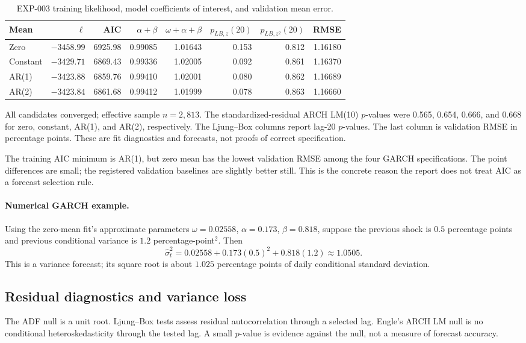 \documentclass[11pt,a4paper]{article}
\begin{document}
\begin{table}[htbp]
\centering\small
\caption{EXP-003 training likelihood, model coefficients of interest, and validation mean error.}
\label{tab:garch-specifications}
\begin{tabular}{lrrrrrrr}
\toprule
Mean & $\ell$ & AIC & $\alpha+\beta$ & $\omega+\alpha+\beta$ & $p_{LB,z}(20)$ & $p_{LB,z^2}(20)$ & RMSE\\
\midrule
Zero & $-3458.99$ & 6925.98 & 0.99085 & 1.01643 & 0.153 & 0.812 & 1.16180\\
Constant & $-3429.71$ & 6869.43 & 0.99336 & 1.02005 & 0.092 & 0.861 & 1.16370\\
AR(1) & $-3423.88$ & 6859.76 & 0.99410 & 1.02001 & 0.080 & 0.862 & 1.16689\\
AR(2) & $-3423.84$ & 6861.68 & 0.99412 & 1.01999 & 0.078 & 0.863 & 1.16660\\
\bottomrule
\end{tabular}
\begin{minipage}{0.96\linewidth}\footnotesize
All candidates converged; effective sample $n=2,813$. The standardized-residual ARCH LM(10)
$p$-values were 0.565, 0.654, 0.666, and 0.668 for zero, constant, AR(1), and AR(2), respectively.
The Ljung--Box columns report lag-20 $p$-values. The last column is validation RMSE in percentage
points. These are fit diagnostics and forecasts, not proofs of correct specification.
\end{minipage}
\end{table}
The training AIC minimum is AR(1), but zero mean has the lowest validation RMSE among the four
GARCH specifications. The point differences are small; the registered validation baselines are
slightly better still. This is the concrete reason the report does not treat AIC as a forecast
selection rule.

\paragraph{Numerical GARCH example.} Using the zero-mean fit's approximate parameters
$\omega=0.02558$, $\alpha=0.173$, $\beta=0.818$, suppose the previous shock is $0.5$ percentage
points and previous conditional variance is $1.2$ percentage-point$^2$. Then
\[
 \widehat\sigma_t^2=0.02558+0.173(0.5)^2+0.818(1.2)\approx1.0505.
\]
This is a variance forecast; its square root is about $1.025$ percentage points of daily
conditional standard deviation.

\subsection{Residual diagnostics and variance loss}
The ADF null is a unit root. Ljung--Box tests assess residual autocorrelation through a selected
lag. Engle's ARCH LM null is no conditional heteroskedasticity through the tested lag. A small
$p$-value is evidence against the null, not a measure of forecast accuracy.
\end{document}
